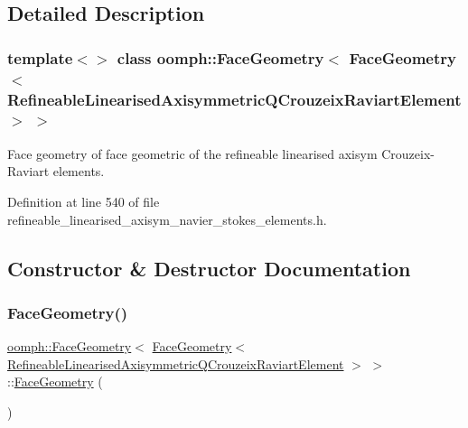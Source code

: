 \subsection{Detailed Description}
\subsubsection*{template$<$$>$\newline
class oomph\+::\+Face\+Geometry$<$ Face\+Geometry$<$ Refineable\+Linearised\+Axisymmetric\+Q\+Crouzeix\+Raviart\+Element $>$ $>$}

Face geometry of face geometric of the refineable linearised axisym Crouzeix-\/\+Raviart elements. 

Definition at line 540 of file refineable\+\_\+linearised\+\_\+axisym\+\_\+navier\+\_\+stokes\+\_\+elements.\+h.



\subsection{Constructor \& Destructor Documentation}
\mbox{\label{classoomph_1_1FaceGeometry_3_01FaceGeometry_3_01RefineableLinearisedAxisymmetricQCrouzeixRaviartElement_01_4_01_4_a1e4a101eebd38872c953e9b714513387}} 
\subsubsection{\texorpdfstring{Face\+Geometry()}{FaceGeometry()}}
{\footnotesize\ttfamily \hyperlink{classoomph_1_1FaceGeometry}{oomph\+::\+Face\+Geometry}$<$ \hyperlink{classoomph_1_1FaceGeometry}{Face\+Geometry}$<$ \hyperlink{classoomph_1_1RefineableLinearisedAxisymmetricQCrouzeixRaviartElement}{Refineable\+Linearised\+Axisymmetric\+Q\+Crouzeix\+Raviart\+Element} $>$ $>$\+::\hyperlink{classoomph_1_1FaceGeometry}{Face\+Geometry} (\begin{DoxyParamCaption}{ }\end{DoxyParamCaption})\hspace{0.3cm}{\ttfamily [inline]}}



